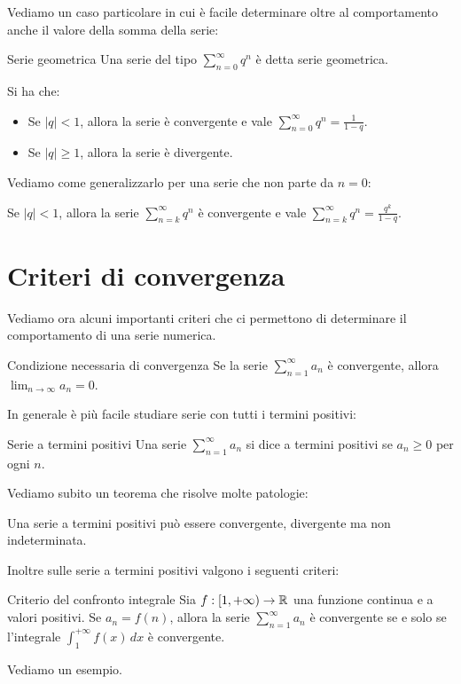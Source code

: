 Vediamo un caso particolare in cui è facile determinare oltre al comportamento anche il valore della somma della serie:
\begin{definizione}{Serie geometrica}
  Una serie del tipo $\sum_{n=0}^{\infty} q^n$ è detta serie geometrica.\\
\end{definizione}
\begin{teorema}{}
  Si ha che:
  \begin{itemize}
    \item Se $|q| < 1$, allora la serie è convergente e vale $\sum_{n=0}^{\infty} q^n = \frac{1}{1-q}$.
    \item Se $|q| \geq 1$, allora la serie è divergente.
  \end{itemize}
\end{teorema}
Vediamo come generalizzarlo per una serie che non parte da $n=0$:
\begin{osservazione}{}
  Se $|q| < 1$, allora la serie $\sum_{n=k}^{\infty} q^n$ è convergente e vale $\sum_{n=k}^{\infty} q^n = \frac{q^k}{1-q}$.
\end{osservazione}

\section{Criteri di convergenza}
Vediamo ora alcuni importanti criteri che ci permettono di determinare il comportamento di una serie numerica.
\begin{teorema}{Condizione necessaria di convergenza}
  Se la serie $\sum_{n=1}^{\infty} a_n$ è convergente, allora $\lim_{n \to \infty} a_n = 0$.
\end{teorema}

In generale è più facile studiare serie con tutti i termini positivi:
\begin{definizione}{Serie a termini positivi}
  Una serie $\sum_{n=1}^{\infty} a_n$ si dice a termini positivi se $a_n \geq 0$ per ogni $n$.
\end{definizione}

Vediamo subito un teorema che risolve molte patologie:
\begin{teorema}{}
  Una serie a termini positivi può essere convergente, divergente ma non indeterminata.\\
\end{teorema}
Inoltre sulle serie a termini positivi valgono i seguenti criteri:
\begin{teorema}{Criterio del confronto integrale}
  Sia $f:[1, +\infty) \to \mathbb{R}$ una funzione continua e a valori positivi. Se $a_n = f(n)$, allora la serie $\sum_{n=1}^{\infty} a_n$ è convergente se e solo se l'integrale $\int_{1}^{+\infty} f(x) \, dx$ è convergente.
\end{teorema}
Vediamo un esempio.\\

